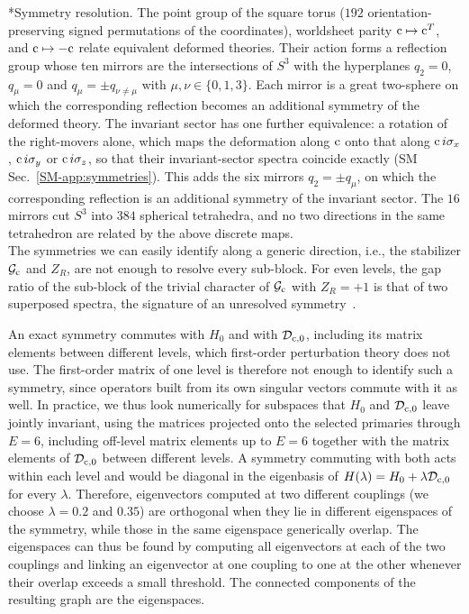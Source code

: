 \documentclass[aps,twocolumn,preprintnumbers,groupedaddress,nofootinbib,prl]{revtex4-2}
\makeatletter
\renewcommand\paragraph{\@startsection{paragraph}{4}{\parindent}{\z@}{-1em}{\normalfont\normalsize\bfseries}}
\newcommand{\Def}{\mathcal D}
\newcommand{\cMat}{{\rm c}}
\newcommand{\Hc}{{\cal G}_{\cMat}}
\newcommand{\Dcz}{\Def_{\cMat,0}}
\makeatother
\begin{document}
\paragraph*{Symmetry resolution.}
The point group of the square torus ($192$ orientation-preserving signed permutations of the coordinates), worldsheet parity $\cMat\mapsto \cMat^T$, and $\cMat\mapsto-\cMat$ relate equivalent deformed theories. Their action forms a reflection group whose ten mirrors are the intersections of $S^3$ with the hyperplanes $q_2=0$, $q_\mu=0$ and $q_\mu=\pm q_{\nu\neq\mu}$ with $\mu,\nu\in\{0,1,3\}$. Each mirror is a great two-sphere on which the corresponding reflection becomes an additional symmetry of the deformed theory. The invariant sector has one further equivalence: a rotation of the right-movers alone, which maps the deformation along $\cMat$ onto that along $\cMat\,i\sigma_x$, $\cMat\,i\sigma_y$ or $\cMat\,i\sigma_z$, so that their invariant-sector spectra coincide exactly (SM Sec.~\ref{SM-app:symmetries}). This adds the six mirrors $q_2=\pm q_\mu$, on which the corresponding reflection is an additional symmetry of the invariant sector. The $16$ mirrors cut $S^3$ into $384$ spherical tetrahedra, and no two directions in the same tetrahedron are related by the above discrete maps.\\

The symmetries we can easily identify along a generic direction, i.e., the stabilizer $\Hc$ and $Z_R$, are not enough to resolve every sub-block. For even levels, the gap ratio of the sub-block of the trivial character of $\Hc$ with $Z_R=+1$ is that of two superposed spectra, the signature of an unresolved symmetry~\cite{Giraud:2020mmb}. 

An exact symmetry commutes with $H_0$ and with $\Dcz$, including its matrix elements between different levels, which first-order perturbation theory does not use. The first-order matrix of one level is therefore not enough to identify such a symmetry, since operators built from its own singular vectors commute with it as well. In practice, we thus look numerically for subspaces that $H_0$ and $\Dcz$ leave jointly invariant, using the matrices projected onto the selected primaries through $E=6$, including off-level matrix elements up to $E=6$ together with the matrix elements of $\Dcz$ between different levels. A symmetry commuting with both acts within each level and would be diagonal in the eigenbasis of $H(\lambda)=H_0+\lambda\Dcz$ for every $\lambda$. Therefore, eigenvectors computed at two different couplings (we choose $\lambda=0.2$ and $0.35$) are orthogonal when they lie in different eigenspaces of the symmetry, while those in the same eigenspace generically overlap. The eigenspaces can thus be found by computing all eigenvectors at each of the two couplings and linking an eigenvector at one coupling to one at the other whenever their overlap exceeds a small threshold. The connected components of the resulting graph are the eigenspaces. 
\end{document}
